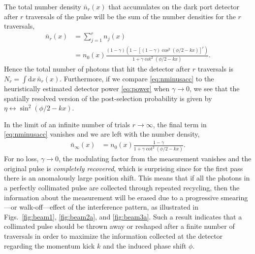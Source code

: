 The total number density $\bar{n}_r(x)$ that accumulates on the dark port detector after $r$ traversals of the pulse will be the sum of the number densities for the $r$ traversals,
\begin{align}\label{eq:nminusacc}
  \bar{n}_r(x) &= \sum_{j=1}^r n_j(x) \\
  &= n_0(x) \frac{(1-\gamma)\left(1 - \left[(1-\gamma) \cos^{2}\left(\phi/2 - kx\right)\right]^r\right)}{1 + \gamma \cot^2\left(\phi/2 - kx\right)}. \nonumber
\end{align}
Hence the total number of photons that hit the detector after $r$ traversals is $N_r = \int \! \textrm{d}x\, \bar{n}_r(x)$.  Furthermore, if we compare \eqref{eq:nminusacc} to the heuristically estimated detector power \eqref{eq:power} when $\gamma\to 0$, we see that the spatially resolved version of the post-selection probability is given by $\eta \leftrightarrow \sin^2(\phi/2 - k x)$.

In the limit of an infinite number of trials $r \to \infty$, the final term in \eqref{eq:nminusacc} vanishes and we are left with the number density,
\begin{align}\label{eq:nminusacclimit}
  \bar{n}_\infty(x) &= n_0(x) \frac{1-\gamma}{1 + \gamma \cot^2\left(\phi/2 - kx\right)}.
\end{align}
For no loss, $\gamma \to 0$, the modulating factor from the measurement vanishes and the original pulse is \emph{completely recovered}, which is surprising since for the first pass there is an anomalously large position shift.  This means that if all the photons in a perfectly collimated pulse are collected through repeated recycling, then the information about the measurement will be erased due to a progressive smearing---or walk-off---effect of the interference pattern, as illustrated in Figs.~\ref{fig:beam1}, \ref{fig:beam2a}, and \ref{fig:beam3a}.  Such a result indicates that a collimated pulse should be thrown away or reshaped after a finite number of traversals in order to maximize the information collected at the detector regarding the momentum kick $k$ and the induced phase shift $\phi$.

